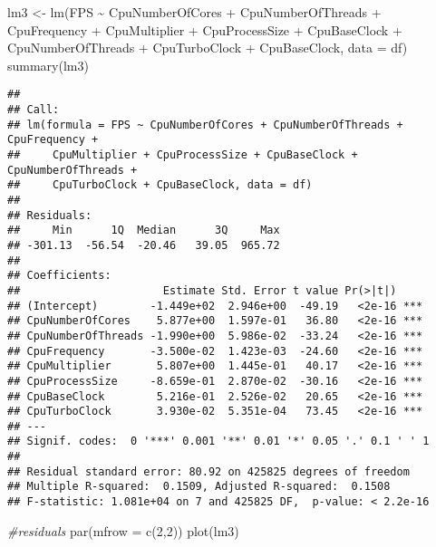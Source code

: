 \documentclass[
]{article}
\newenvironment{Shaded}{\begin{snugshade}}{\end{snugshade}}
\newcommand{\AttributeTok}[1]{\textcolor[rgb]{0.77,0.63,0.00}{#1}}
\newcommand{\CommentTok}[1]{\textcolor[rgb]{0.56,0.35,0.01}{\textit{#1}}}
\newcommand{\DecValTok}[1]{\textcolor[rgb]{0.00,0.00,0.81}{#1}}
\newcommand{\FunctionTok}[1]{\textcolor[rgb]{0.00,0.00,0.00}{#1}}
\newcommand{\NormalTok}[1]{#1}
\newcommand{\OtherTok}[1]{\textcolor[rgb]{0.56,0.35,0.01}{#1}}
\newcommand{\SpecialCharTok}[1]{\textcolor[rgb]{0.00,0.00,0.00}{#1}}
\begin{document}
\begin{Shaded}
\begin{Highlighting}[]
\NormalTok{lm3 }\OtherTok{\textless{}{-}} \FunctionTok{lm}\NormalTok{(FPS }\SpecialCharTok{\textasciitilde{}}\NormalTok{ CpuNumberOfCores }\SpecialCharTok{+}\NormalTok{ CpuNumberOfThreads }\SpecialCharTok{+}\NormalTok{  CpuFrequency }\SpecialCharTok{+}\NormalTok{ CpuMultiplier }\SpecialCharTok{+}\NormalTok{ CpuProcessSize }\SpecialCharTok{+}\NormalTok{ CpuBaseClock }\SpecialCharTok{+}\NormalTok{ CpuNumberOfThreads }\SpecialCharTok{+}\NormalTok{ CpuTurboClock }\SpecialCharTok{+}\NormalTok{ CpuBaseClock, }\AttributeTok{data =}\NormalTok{ df)}
\FunctionTok{summary}\NormalTok{(lm3)}
\end{Highlighting}
\end{Shaded}

\begin{verbatim}
## 
## Call:
## lm(formula = FPS ~ CpuNumberOfCores + CpuNumberOfThreads + CpuFrequency + 
##     CpuMultiplier + CpuProcessSize + CpuBaseClock + CpuNumberOfThreads + 
##     CpuTurboClock + CpuBaseClock, data = df)
## 
## Residuals:
##     Min      1Q  Median      3Q     Max 
## -301.13  -56.54  -20.46   39.05  965.72 
## 
## Coefficients:
##                      Estimate Std. Error t value Pr(>|t|)    
## (Intercept)        -1.449e+02  2.946e+00  -49.19   <2e-16 ***
## CpuNumberOfCores    5.877e+00  1.597e-01   36.80   <2e-16 ***
## CpuNumberOfThreads -1.990e+00  5.986e-02  -33.24   <2e-16 ***
## CpuFrequency       -3.500e-02  1.423e-03  -24.60   <2e-16 ***
## CpuMultiplier       5.807e+00  1.445e-01   40.17   <2e-16 ***
## CpuProcessSize     -8.659e-01  2.870e-02  -30.16   <2e-16 ***
## CpuBaseClock        5.216e-01  2.526e-02   20.65   <2e-16 ***
## CpuTurboClock       3.930e-02  5.351e-04   73.45   <2e-16 ***
## ---
## Signif. codes:  0 '***' 0.001 '**' 0.01 '*' 0.05 '.' 0.1 ' ' 1
## 
## Residual standard error: 80.92 on 425825 degrees of freedom
## Multiple R-squared:  0.1509, Adjusted R-squared:  0.1508 
## F-statistic: 1.081e+04 on 7 and 425825 DF,  p-value: < 2.2e-16
\end{verbatim}

\begin{Shaded}
\begin{Highlighting}[]
\CommentTok{\#residuals}
\FunctionTok{par}\NormalTok{(}\AttributeTok{mfrow =} \FunctionTok{c}\NormalTok{(}\DecValTok{2}\NormalTok{,}\DecValTok{2}\NormalTok{))}
\FunctionTok{plot}\NormalTok{(lm3)}
\end{Highlighting}
\end{Shaded}
\end{document}
